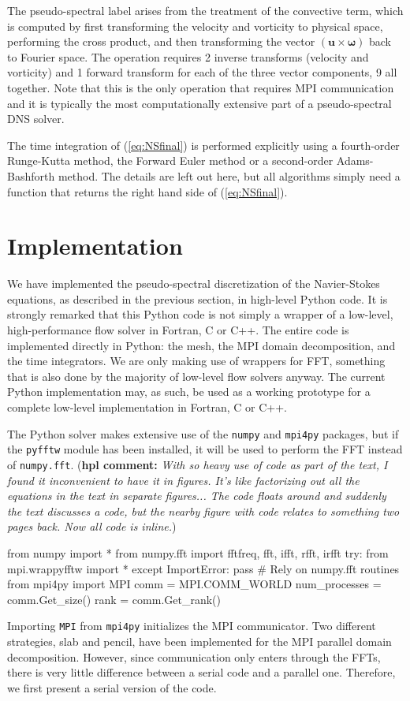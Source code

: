 \documentclass[11pt, oneside]{article}
\newcommand{\hpl}[1]{({\bf hpl comment:} \emph{#1})}
\begin{document}
The pseudo-spectral label arises from the treatment of the convective term, which is computed by first transforming the velocity and vorticity to physical space, performing the cross product, and then transforming the vector ${(\bm{u}  \times  \bm{\omega})}$  back to Fourier space. The operation requires 2 inverse transforms (velocity and vorticity) and 1 forward transform for each of the three vector components, 9 all together. Note that this is the only operation that requires MPI communication and it is typically the most computationally extensive part of a pseudo-spectral DNS solver.

The time integration of (\ref{eq:NSfinal}) is performed explicitly using a fourth-order Runge-Kutta method, the Forward Euler method or a second-order Adams-Bashforth method. The details are left out here, but all algorithms simply need a function that returns the right hand side of (\ref{eq:NSfinal}).

\section{Implementation}

We have implemented the pseudo-spectral discretization of the Navier-Stokes equations, as described in the previous section, in high-level Python code. It is strongly remarked that this Python code is not simply a wrapper of a low-level, high-performance flow solver in Fortran, C or C++. The entire code is implemented directly in Python: the mesh, the MPI domain decomposition, and the time integrators. We are only making use of wrappers for FFT, something that is also done by the majority of low-level flow solvers anyway. The current Python implementation may, as such, be used as a working prototype for a complete low-level implementation in Fortran, C or C++.

The Python solver makes extensive use of the \texttt{numpy} and \texttt{mpi4py} packages, but if the \texttt{pyfftw} module has been installed, it will be used to perform the FFT instead of \texttt{numpy.fft}.
\hpl{With so heavy use of code as part of the text, I found it inconvenient to have it in figures. It's like factorizing out all the equations in the text in separate figures... The code floats around and suddenly the text discusses a code, but the nearby figure with code relates to something two pages back. Now all code is inline.}

\begin{python}
from numpy import *
from numpy.fft import fftfreq, fft, ifft, rfft, irfft
try:
    from mpi.wrappyfftw import *
except ImportError:
    pass # Rely on numpy.fft routines
from mpi4py import MPI
comm = MPI.COMM_WORLD
num_processes = comm.Get_size()
rank = comm.Get_rank()
\end{python}
Importing \texttt{MPI} from \texttt{mpi4py} initializes the MPI communicator. Two different strategies, slab and pencil, have been implemented for the MPI parallel domain decomposition. However, since communication only enters through the FFTs, there is very little difference between a serial code and a parallel one. Therefore, we first present a serial version of the code.
\end{document}
